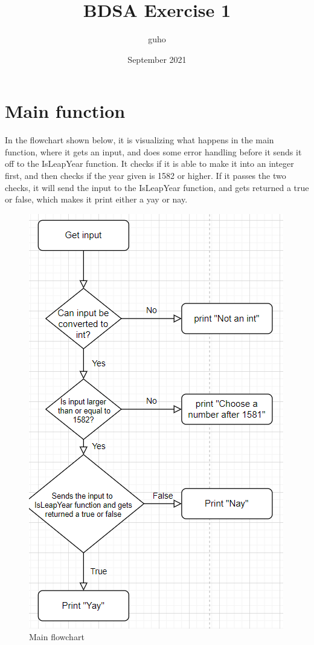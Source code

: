 \documentclass{article}
\title{BDSA Exercise 1}
\author{guho }
\date{September 2021}
\begin{document}
\maketitle

\section{Main function}

In the flowchart shown below, it is visualizing what happens in the main function, where it gets an input, and does some error handling before it sends it off to the IsLeapYear function. It checks if it is able to make it into an integer first, and then checks if the year given is 1582 or higher. If it passes the two checks, it will send the input to the IsLeapYear function, and gets returned a true or false, which makes it print either a yay or nay.

\begin{figure}[ht]
    \centering
    \includegraphics[scale=0.6]{Pictures/main flowchart.PNG}
    \caption{Main flowchart}
    \label{fig:main}
\end{figure}
\end{document}
